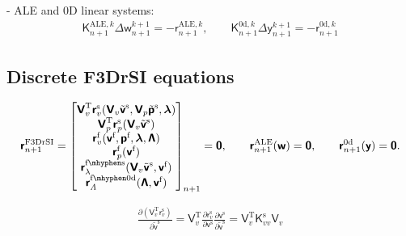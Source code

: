 \documentclass[a4paper,12pt]{report}
\newcommand{\fS}{\text{s}}
\newcommand{\fF}{\text{f}}
\newcommand{\bs}[1]{\boldsymbol{#1}}
\newcommand{\ROP}{\bs{\mathsf{r}}}
\newcommand{\zd}{\bs{\mathsf{y}}} %
\newcommand{\VF}{\bs{\mathsf{v}}^{\fF}}
\newcommand{\VS}{\bs{\mathsf{v}}^{\fS}}
\newcommand{\PF}{\bs{\mathsf{p}}^{\fF}}
\newcommand{\VA}{\bs{\mathsf{w}}}
\newcommand{\LM}{\bs{\mathsf{\lambda}}}
\newcommand{\LMZ}{\bs{\mathsf{\Lambda}}}
\newcommand{\Y}{\bs{\mathsf{y}}} %
\newcommand{\VSr}{\tilde{\bs{\mathsf{v}}}^{\fS}}
\newcommand{\PSr}{\tilde{\bs{\mathsf{p}}}^{\fS}}
\newcommand{\lmi}{\lambda} %
\newcommand{\lmzi}{\mathit{\Lambda}} %
\begin{document}
- ALE and 0D linear systems:
\begin{align}
\bs{\mathsf{K}}_{n+1}^{\mathrm{ALE},k}\Delta\VA_{n+1}^{k+1}=-\bs{\mathsf{r}}_{n+1}^{\mathrm{ALE},k}, \qquad \bs{\mathsf{K}}_{n+1}^{\mathrm{0d},k}\Delta\Y_{n+1}^{k+1}=-\bs{\mathsf{r}}_{n+1}^{\mathrm{0d},k}\label{eq:lin_sys_ale_0d}   
\end{align}

\subsection{Discrete F3DrSI equations}

\begin{align}
    \ROP_{n+1}^{\mathrm{F3DrSI}} = \begin{bmatrix}\bs{\mathsf{V}}_{v}^{\mathrm{T}}\ROP_{v}^{\fS}(\bs{\mathsf{V}}_{v}\VSr,\bs{\mathsf{V}}_{p}\PSr,\LM) \\ \bs{\mathsf{V}}_{p}^{\mathrm{T}}\ROP_{p}^{\fS}(\bs{\mathsf{V}}_{v}\VSr) \\ \ROP_{v}^{\fF}(\VF,\PF,\LM,\LMZ) \\ \ROP_{p}^{\fF}(\VF) \\ \ROP_{\lmi}^{\mathrm{\fF\mhyphen\fS}}(\bs{\mathsf{V}}_{v}\VSr,\VF) \\ \ROP_{\lmzi}^{\mathrm{\fF\mhyphen 0d}}(\LMZ,\VF)\end{bmatrix}_{n+1} = \bs{\mathsf{0}},
    \qquad \bs{\mathsf{r}}_{n+1}^{\mathrm{ALE}}(\VA) = \bs{\mathsf{0}},
    \qquad \bs{\mathsf{r}}_{n+1}^{\mathrm{0d}}(\Y) = \bs{\mathsf{0}}.\label{eq:res_nonlin_f3rsi}
\end{align}

\begin{align}
    \frac{\partial (\bs{\mathsf{V}}_{v}^{\mathrm{T}}\ROP_{v}^{\fS})}{\partial \VSr} = \bs{\mathsf{V}}_{v}^{\mathrm{T}} \frac{\partial \ROP_{v}^{\fS}}{\partial \VS} \frac{\partial \VS}{\partial \VSr} = \bs{\mathsf{V}}_{v}^{\mathrm{T}} \bs{\mathsf{K}}_{vv}^{\fS} \bs{\mathsf{V}}_{v}
\end{align}
\end{document}
